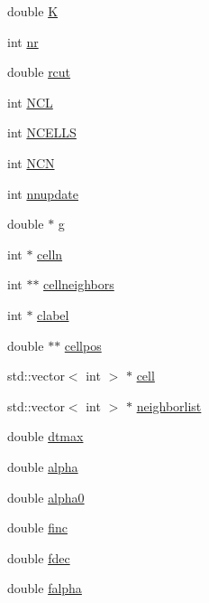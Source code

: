 \begin{DoxyCompactItemize}
double \mbox{\hyperlink{classpacking_acf38ce991d03baddda7344ec7e979f6c}{K}}
\item 
int \mbox{\hyperlink{classpacking_a31eede3d604c45fef6021170ee506c77}{nr}}
\item 
double \mbox{\hyperlink{classpacking_aefd159c50069573f1f2a3a6f0ff50984}{rcut}}
\item 
int \mbox{\hyperlink{classpacking_a9a8d986ed98d37a87ea3f3785c0ffe61}{N\+CL}}
\item 
int \mbox{\hyperlink{classpacking_a212d4cc14a81cd3bb06ec7cbb5b74567}{N\+C\+E\+L\+LS}}
\item 
int \mbox{\hyperlink{classpacking_a4e173c52dc54a01ee8a8c42a0afd473f}{N\+CN}}
\item 
int \mbox{\hyperlink{classpacking_aae18c45219be166f5f1e44ab838f2252}{nnupdate}}
\item 
double $\ast$ \mbox{\hyperlink{classpacking_abe2f507633454e3d2d8fd42161bcae09}{g}}
\item 
int $\ast$ \mbox{\hyperlink{classpacking_ae917ff801cb46aad3cb68a44acce4020}{celln}}
\item 
int $\ast$$\ast$ \mbox{\hyperlink{classpacking_a644c3ce4ed2caba0c84f30af9f7d58a8}{cellneighbors}}
\item 
int $\ast$ \mbox{\hyperlink{classpacking_a3610364abb17fe2c0bacec06e05d9123}{clabel}}
\item 
double $\ast$$\ast$ \mbox{\hyperlink{classpacking_a4b3af5f349b64a433c53382610fb6563}{cellpos}}
\item 
std\+::vector$<$ int $>$ $\ast$ \mbox{\hyperlink{classpacking_a5c104fd62aea53bee075d978dd6d9d6a}{cell}}
\item 
std\+::vector$<$ int $>$ $\ast$ \mbox{\hyperlink{classpacking_a4ef3865ec63508098d2957022fe11b8f}{neighborlist}}
\item 
double \mbox{\hyperlink{classpacking_ae4a4b73d1937c50d564cd71886d17fab}{dtmax}}
\item 
double \mbox{\hyperlink{classpacking_a9683c4c16704f81b0086a7639f030953}{alpha}}
\item 
double \mbox{\hyperlink{classpacking_afa09f18e29cec06705f33a5253f1b016}{alpha0}}
\item 
double \mbox{\hyperlink{classpacking_ac67189efe0f5c00878074d9e1a6fd80a}{finc}}
\item 
double \mbox{\hyperlink{classpacking_a2188035c9e34ec7f636822e83e785513}{fdec}}
\item 
double \mbox{\hyperlink{classpacking_a6bd8393eedd89fe3082be57be371dbaf}{falpha}}
\item 

\end{DoxyCompactItemize}
